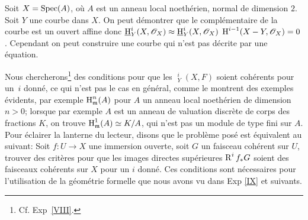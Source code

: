 \begin{exemple} \label{III.3.13}
Soit $X=\operatorname{Spec} (A)$, o\`u $A$ est un anneau local noeth\'erien, normal de dimension $2$. Soit $Y$ une courbe dans $X$. On peut d\'emontrer que le compl\'ementaire de la courbe est un ouvert affine donc $\mathop{\underline{\mathrm{H}}}\nolimits_Y^i(X, \mathscr{O}_X) \approx \mathop{\underline{\mathrm{H}}}\nolimits_Y^i(X, \mathscr{O}_X)$ $\operatorname{H}^{i-1}(X-Y, \mathscr{O}_X)=0$. Cependant on peut construire une courbe qui n'est pas d\'ecrite par une \'equation.
\end{exemple}

Nous chercherons\footnote{Cf. Exp~\ref{VIII}.} des conditions pour que les $\mathop{\underline{\mathrm{H}}}\nolimits_Y^i(X, F)$ soient coh\'erents pour un~$i$ donn\'e, ce qui n'est pas le cas en g\'en\'eral, comme le montrent des exemples \'evidents, par exemple $\operatorname{H}_{\mathfrak{m}}^n(A)$ pour $A$ un anneau local noeth\'erien de dimension $n>0$; lorsque par exemple $A$ est un anneau de valuation discr\`ete de corps des fractions $K$, on trouve $\operatorname{H}_{\mathfrak{m}}^1(A) \simeq K/A$, qui n'est pas un module de type fini sur $A$. Pour \'eclairer la lanterne du lecteur, disons que le probl\`eme pos\'e est \'equivalent au suivant: Soit $f:U\to X$ une immersion ouverte, soit $G$ un faisceau coh\'erent sur $U$, trouver des crit\`eres pour que les images directes sup\'erieures $\operatorname{R}^i f_* G$ soient des faisceaux coh\'erents sur $X$ pour un $i$ donn\'e. Ces conditions sont n\'ecessaires pour l'utilisation de la g\'eom\'etrie formelle que nous avons vu dans Exp \ref{IX} et \ignorespaces suivants.

